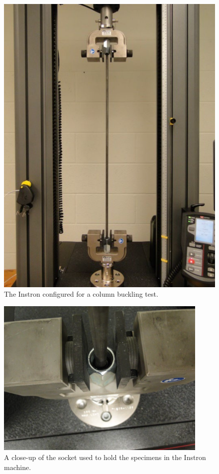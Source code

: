 \documentclass[12 pt]{article}
\begin{document}
\begin{figure}[htbp]
\begin{minipage}{0.45\textwidth}
		\includegraphics[width=1.0\textwidth]{images/instron_2}
		\caption{The Instron configured for a column buckling test.}
		\label{fig:instron_2}
    \end{minipage}
\end{figure}

\begin{figure}[htbp]
	\centering
	\includegraphics[width=4in]{images/socket}
	\caption{A close-up of the socket used to hold the specimens in the Instron machine.}
	\label{fig:socket}
\end{figure}
\end{document}
